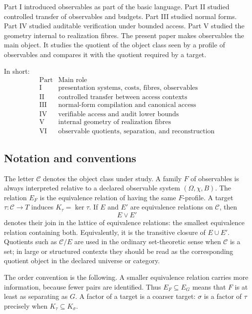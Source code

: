 \documentclass[11pt]{article}
\theoremstyle{definition}
\theoremstyle{remark}
\begin{document}
Part I introduced observables as part of the basic language.  Part II studied controlled transfer of observables and budgets.  Part III studied normal forms.  Part IV studied auditable verification under bounded access.  Part V studied the geometry internal to realization fibres.  The present paper makes observables the main object.  It studies the quotient of the object class seen by a profile of observables and compares it with the quotient required by a target.

In short:
\[
\begin{array}{c|l}
\text{Part} & \text{Main role}\\
\hline
\text{I} & \text{presentation systems, costs, fibres, observables}\\
\text{II} & \text{controlled transfer between access contexts}\\
\text{III} & \text{normal-form compilation and canonical access}\\
\text{IV} & \text{verifiable access and audit lower bounds}\\
\text{V} & \text{internal geometry of realization fibres}\\
\text{VI} & \text{observable quotients, separation, and reconstruction}
\end{array}
\]

\subsection*{Notation and conventions}

The letter \(\mathcal C\) denotes the object class under study.  A family \(F\) of observables is always interpreted relative to a declared observable system \((\Omega,\chi,B)\).  The relation \(E_F\) is the equivalence relation of having the same \(F\)-profile.  A target \(\tau:\mathcal C\to T\) induces \(K_\tau=\ker \tau\).  If \(E\) and \(E'\) are equivalence relations on \(\mathcal C\), then
\[
E\vee E'
\]
denotes their join in the lattice of equivalence relations: the smallest equivalence relation containing both.  Equivalently, it is the transitive closure of \(E\cup E'\).  Quotients such as \(\mathcal C/E\) are used in the ordinary set-theoretic sense when \(\mathcal C\) is a set; in large or structured contexts they should be read as the corresponding quotient object in the declared universe or category.

The order convention is the following.  A smaller equivalence relation carries more information, because fewer pairs are identified.  Thus \(E_F\subseteq E_G\) means that \(F\) is at least as separating as \(G\).  A factor of a target is a coarser target: \(\sigma\) is a factor of \(\tau\) precisely when \(K_\tau\subseteq K_\sigma\).
\end{document}
